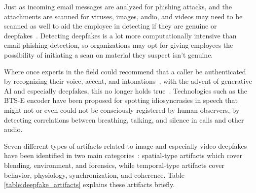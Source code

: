 Just as incoming email messages are analyzed for phishing attacks, and the attachments are scanned for viruses, images, audio, and videos may need to be scanned as well to aid the employee in detecting if they are genuine or deepfakes~\citep{mirsky_Creation_Detection_Deepfakes_2021}. Detecting deepfakes is a lot more computationally intensive than email phishing detection, so organizations may opt for giving employees the possibility of initiating a scan on material they suspect isn’t genuine.



Where once experts in the field could recommend that a caller be authenticated by recognizing their voice, accent, and intonations~\citep{mitnick_The_Art_of_Deception_2003}, with the advent of generative AI and especially deepfakes, this no longer holds true~\citep{doan_BTSE_Audio_Deepfake_Detection_2023}. Technologies such as the BTS-E encoder have been proposed for spotting idiosyncrasies in speech that might not or even could not be consciously registered by human observers, by detecting correlations between breathing, talking, and silence in calls and other audio.

%
%
Seven different types of artifacts related to image and especially video deepfakes have been identified in two main categories~\citep{mirsky_Creation_Detection_Deepfakes_2021}: spatial-type artifacts which cover blending, environment, and forensics, while temporal-type artifacts cover behavior, physiology, synchronization, and coherence. Table \ref{table:deepfake_artifacts} explains these artifacts briefly.

